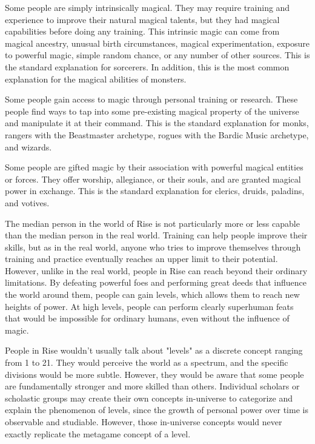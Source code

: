   Some people are simply intrinsically magical.
  They may require training and experience to improve their natural magical talents, but they had magical capabilities before doing any training.
  This intrinsic magic can come from magical ancestry, unusual birth circumstances, magical experimentation, exposure to powerful magic, simple random chance, or any number of other sources.
  This is the standard explanation for sorcerers.
  In addition, this is the most common explanation for the magical abilities of monsters.

  Some people gain access to magic through personal training or research.
  These people find ways to tap into some pre-existing magical property of the universe and manipulate it at their command.
  This is the standard explanation for monks, rangers with the Beastmaster archetype, rogues with the Bardic Music archetype, and wizards.

  Some people are gifted magic by their association with powerful magical entities or forces.
  They offer worship, allegiance, or their souls, and are granted magical power in exchange.
  This is the standard explanation for clerics, druids, paladins, and votives.

  The median person in the world of Rise is not particularly more or less capable than the median person in the real world.
  Training can help people improve their skills, but as in the real world, anyone who tries to improve themselves through training and practice eventually reaches an upper limit to their potential.
  However, unlike in the real world, people in Rise can reach beyond their ordinary limitations.
  By defeating powerful foes and performing great deeds that influence the world around them, people can gain levels, which allows them to reach new heights of power.
  At high levels, people can perform clearly superhuman feats that would be impossible for ordinary humans, even without the influence of magic.

  People in Rise wouldn't usually talk about "levels" as a discrete concept ranging from 1 to 21.
  They would perceive the world as a spectrum, and the specific divisions would be more subtle.
  However, they would be aware that some people are fundamentally stronger and more skilled than others.
  Individual scholars or scholastic groups may create their own concepts in-universe to categorize and explain the phenomenon of levels, since the growth of personal power over time is observable and studiable.
  However, those in-universe concepts would never exactly replicate the metagame concept of a level.

